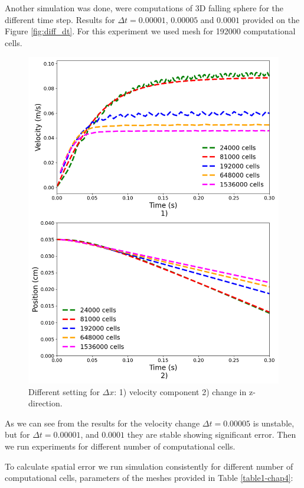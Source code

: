 Another simulation was done, were computations of 3D falling sphere for the different time step. Results for $\Delta t = 0.00001$, $0.00005$ and $0.0001$ provided on the Figure \ref{fig:diff_dt}. For this experiment we used mesh for 192000 computational cells.
\begin{figure}[H]
    \centering
    \includegraphics[width=14cm]{ GWU_Thesis_Sarmakeeva/Images/chap3/nan_simulation_192000_diff_cells_number.png}
    \caption{ Different setting for $\Delta x$: 1) velocity component 2) change in z-direction.}
    \label{fig:cell_num}
\end{figure}
As we can see from the results for the velocity change $\Delta t = 0.00005$ is unstable, but for $\Delta t = 0.00001$, and $0.0001$ they are stable showing significant error. Then we run experiments for different number of computational cells.

To calculate spatial error we run simulation consistently for different number of computational cells, parameters of the meshes provided in Table \ref{table1-chap4}:

